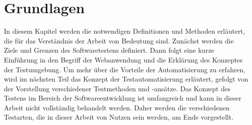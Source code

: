 \chapter{Grundlagen}\label{ch:grundlagen}

In diesem Kapitel werden die notwendigen Definitionen und Methoden erläutert,
die für das Verständnis der Arbeit von Bedeutung sind. Zunächst werden die
Ziele und Grenzen des Softwaretestens definiert. Dann folgt eine kurze
Einführung in den Begriff der Webanwendung und  die Erklärung des Konzeptes
der Testumgebung. Um mehr über die Vorteile der Automatisierung zu erfahren,
wird im nächsten Teil das Konzept der Testautomatisierung erläutert, gefolgt
von der Vorstellung verschiedener Testmethoden und -ansätze. Das Konzept des
Testens im Bereich der Softwareentwicklung ist umfangreich und kann in dieser
Arbeit nicht vollständig behandelt werden. Daher werden die verschiedenen
Testarten, die in dieser Arbeit von Nutzen sein werden, am Ende vorgestellt.










